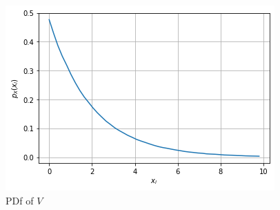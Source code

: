 \begin{enumerate}[label=\thesubsection.\arabic*.,ref=\thesubsection.\theenumi]
\begin{figure}[!ht]
\centering
\includegraphics[width=\columnwidth]{./figs/trans/6.1.1.pdf.png}
\caption{PDf of $V$}
\label{fig:probman_trans_PDf_V}
\end{figure}


\end{enumerate}
